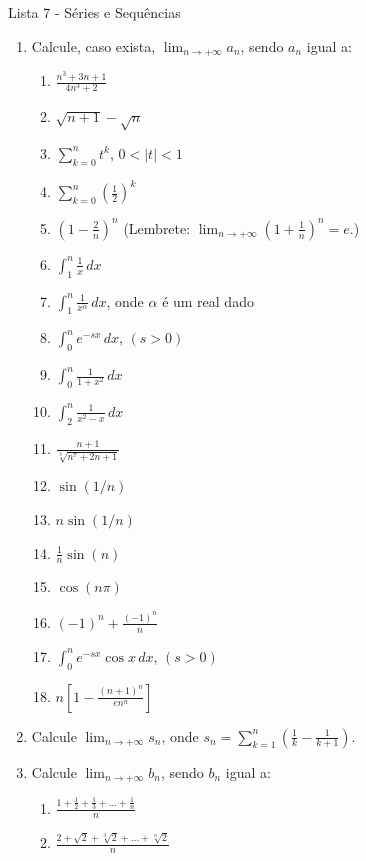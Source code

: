 \documentclass[11pt,a4paper]{article}
\newcommand{\limite}{\displaystyle\lim}
\newcommand{\integral}{\displaystyle\int}
\newcommand{\somatorio}{\displaystyle\sum}
\begin{document}
	\begin{center}
		\Large Lista 7 - Séries e Sequências
	\end{center}

	\begin{enumerate}
	
		\item Calcule, caso exista, $\limite_{n \to +\infty} a_n$, sendo $a_n$ igual a:
		\begin{enumerate}
			\item $\displaystyle \frac{n^3 + 3n + 1}{4n^3 + 2}$
			\item $\sqrt{n + 1} - \sqrt{n}$
			\item $\somatorio_{k=0}^{n} t^k $, $0 < |t| < 1$
			\item $\somatorio_{k=0}^{n} \displaystyle \left(\frac{1}{2}\right)^k $
			\item $\left(1 - \displaystyle \frac{2}{n}\right)^n$ (Lembrete: $\limite_{n \to +\infty} \left(1 + \displaystyle \frac{1}{n}\right)^n = e$.)
			\item $\integral_1^{n} \displaystyle\frac{1}{x} \, dx$
			\item $\integral_1^{n} \displaystyle\frac{1}{x^\alpha} \, dx$, onde $\alpha$ é um real dado
			\item $\integral_0^{n} e^{-sx} \, dx$, $(s > 0)$
			\item $\integral_0^{n} \displaystyle\frac{1}{1 + x^2} \, dx$
			\item $\integral_2^{n} \displaystyle\frac{1}{x^2 - x} \, dx$
			\item $\displaystyle\frac{n + 1}{\sqrt[3]{n^7 + 2n + 1}}$
			\item $\sin (1/n)$
			\item $n \sin (1/n)$
			\item $\displaystyle \frac{1}{n} \sin (n)$
			\item $\cos (n \pi)$
			\item $(-1)^n + \displaystyle \frac{(-1)^n}{n}$
			\item $\integral_0^{n} e^{-sx} \cos x \, dx$, $(s > 0)$
			\item $n\left[1 - \displaystyle \frac{(n+1)^n}{en^n}\right]$
		\end{enumerate}
		
		\item Calcule $\limite_{n \to +\infty} s_n$, onde $s_n = \somatorio_{k=1}^{n} \displaystyle \left(\frac{1}{k} - \frac{1}{k + 1}\right)$.
		
		\item Calcule $\limite_{n \to +\infty} b_n$, sendo $b_n$ igual a:
		\begin{enumerate}
			\item $\displaystyle \frac{1 + \displaystyle\frac{1}{2} + \displaystyle\frac{1}{3} + ... + \displaystyle\frac{1}{n}}{n}$
			\item $\displaystyle \frac{2 + \sqrt{2} + \sqrt[3]{2} + ... + \sqrt[n]{2}}{n}$
		\end{enumerate}
		

\end{enumerate}
\end{document}

